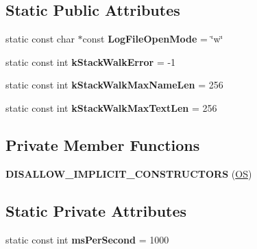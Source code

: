 \subsection*{Static Public Attributes}
\begin{DoxyCompactItemize}
\item 
static const char $\ast$const {\bfseries Log\+File\+Open\+Mode} = \char`\"{}w\char`\"{}\hypertarget{classv8_1_1base_1_1_o_s_a4fee8706153911cacd3c3c58f17e49c6}{}\label{classv8_1_1base_1_1_o_s_a4fee8706153911cacd3c3c58f17e49c6}

\item 
static const int {\bfseries k\+Stack\+Walk\+Error} = -\/1\hypertarget{classv8_1_1base_1_1_o_s_abb7fec618d8fdfb357903e5f30aed605}{}\label{classv8_1_1base_1_1_o_s_abb7fec618d8fdfb357903e5f30aed605}

\item 
static const int {\bfseries k\+Stack\+Walk\+Max\+Name\+Len} = 256\hypertarget{classv8_1_1base_1_1_o_s_a56a4e15bc8d825319f97c24c4f86c7ca}{}\label{classv8_1_1base_1_1_o_s_a56a4e15bc8d825319f97c24c4f86c7ca}

\item 
static const int {\bfseries k\+Stack\+Walk\+Max\+Text\+Len} = 256\hypertarget{classv8_1_1base_1_1_o_s_ab2145f00362a85b3d6e1be7654d44774}{}\label{classv8_1_1base_1_1_o_s_ab2145f00362a85b3d6e1be7654d44774}

\end{DoxyCompactItemize}
\subsection*{Private Member Functions}
\begin{DoxyCompactItemize}
\item 
{\bfseries D\+I\+S\+A\+L\+L\+O\+W\+\_\+\+I\+M\+P\+L\+I\+C\+I\+T\+\_\+\+C\+O\+N\+S\+T\+R\+U\+C\+T\+O\+RS} (\hyperlink{classv8_1_1base_1_1_o_s}{OS})\hypertarget{classv8_1_1base_1_1_o_s_acc4a3b82ccb58109918e2fc0a42d65e5}{}\label{classv8_1_1base_1_1_o_s_acc4a3b82ccb58109918e2fc0a42d65e5}

\end{DoxyCompactItemize}
\subsection*{Static Private Attributes}
\begin{DoxyCompactItemize}
\item 
static const int {\bfseries ms\+Per\+Second} = 1000\hypertarget{classv8_1_1base_1_1_o_s_af1d375f1903295527fc6a4f17c4b7e21}{}\label{classv8_1_1base_1_1_o_s_af1d375f1903295527fc6a4f17c4b7e21}

\end{DoxyCompactItemize}


